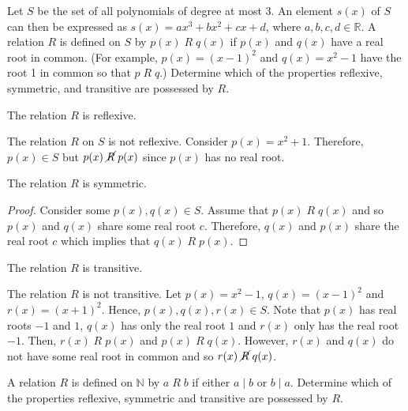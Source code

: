 \documentclass[12pt]{article}
\newcommand{\N}{\mathbb{N}}
\newcommand{\R}{\mathbb{R}}
\newenvironment{problem}[2][Problem]{\begin{trivlist}
		\item[\hskip \labelsep {\bfseries #1}\hskip \labelsep {\bfseries #2.}]}{\end{trivlist}}
\newenvironment{solution}[2][Solution]{\begin{trivlist}
		\item[\hskip \labelsep {\bfseries #1}\hskip \labelsep {\bfseries #2.}]}{\end{trivlist}}
\begin{document}
 	\begin{problem}{22}
 		Let $S$ be the set of all polynomials of degree at most 3. An element $s(x)$ of $S$ can then be expressed as $s(x) = ax^{3} + bx^{2} +cx +d$, where $a,b,c,d\in \R$. A relation $R$ is defined on $S$ by $p(x) \; R \; q(x)$ if $p(x)$ and $q(x)$ have a real root in common. (For example, $p(x) = (x-1)^{2}$ and $q(x) = x^{2}-1$ have the root 1 in common so that $p \; R \; q$.) Determine which of the properties reflexive, symmetric, and transitive are possessed by $R$.
 		\begin{enumerate}
 			\item The relation $R$ is reflexive.
 			\begin{solution}{(a)}
 				The relation $R$ on $S$ is not reflexive. Consider $p(x) = x^{2}+1$. Therefore, $p(x)\in S$ but $p(x) \; \cancel R \; p(x)$ since $p(x)$ has no real root.
 			\end{solution}
 			\item The relation $R$ is symmetric.
 			\begin{proof}
 				Consider some $p(x),q(x)\in S$. Assume that $p(x) \; R \; q(x)$ and so $p(x)$ and $q(x)$ share some real root $c$. Therefore, $q(x)$ and $p(x)$ share the real root $c$ which implies that $q(x)\; R \; p(x)$.
 			\end{proof}
 			\item The relation $R$ is transitive.
 			\begin{solution}{(c)}
 				The relation $R$ is not transitive.
 				Let $p(x)=x^{2}-1$, $q(x)=(x-1)^{2}$ and $r(x) = (x+1)^{2}$. Hence, $p(x),q(x),r(x)\in S$. Note that $p(x)$ has real roots $-1$ and $1$, $q(x)$ has only the real root $1$ and $r(x)$ only has the real root $-1$. Then, $r(x) \; R \; p(x)$ and $p(x) \; R \; q(x)$. However, $r(x)$ and $q(x)$ do not have some real root in common and so $r(x)\; \cancel R \; q(x)$.
 			\end{solution}
 		\end{enumerate}
 	\end{problem}
 
 	\begin{problem}{23}
 		A relation $R$ is defined on $\N$ by $a\; R \; b$ if either $a\mid b$ or $b\mid a$. Determine which of the properties reflexive, symmetric and transitive are possessed by $R$.
 	\end{problem}
\end{document}
